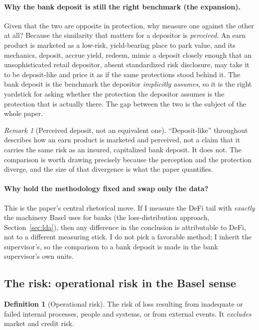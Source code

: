 \documentclass[11pt]{article}
\theoremstyle{definition}
\newtheorem{definition}[theorem]{Definition}
\theoremstyle{remark}
\newtheorem{remark}[theorem]{Remark}
\theoremstyle{definition}
\newcommand{\1}{\mathbf{1}}
\begin{document}
\paragraph{Why the bank deposit is still the right benchmark (the expansion).}
Given that the two are opposite in protection, why measure one against the other
at all? Because the similarity that matters for a depositor is \emph{perceived}.
An earn product is marketed as a low-risk, yield-bearing place to park value, and
its mechanics, deposit, accrue yield, redeem, mimic a deposit closely enough that
an unsophisticated retail depositor, absent standardized risk disclosure, may
take it to be deposit-like and price it as if the same protections stood behind
it. The bank deposit is the benchmark the depositor \emph{implicitly assumes}, so
it is the right yardstick for asking whether the protection the depositor assumes
is the protection that is actually there. The gap between the two is the subject
of the whole paper.

\begin{remark}[Perceived deposit, not an equivalent one]
``Deposit-like'' throughout describes how an earn product is marketed and
perceived, not a claim that it carries the same risk as an insured, capitalized
bank deposit. It does not. The comparison is worth drawing precisely because the
perception and the protection diverge, and the size of that divergence is what
the paper quantifies.
\end{remark}

\paragraph{Why hold the methodology fixed and swap only the data?}
This is the paper's central rhetorical move. If I measure the DeFi tail with
\emph{exactly} the machinery Basel uses for banks (the loss-distribution
approach, Section~\ref{sec:lda}), then any difference in the conclusion is
attributable to DeFi, not to a different measuring stick. I do not pick a
favorable method; I inherit the supervisor's, so the comparison to a bank
deposit is made in the bank supervisor's own units.

\subsection{The risk: operational risk in the Basel sense}\label{sec:oprisk}

\begin{definition}[Operational risk]
The risk of loss resulting from inadequate or failed internal processes,
people and systems, or from external events. It \emph{excludes} market and
credit risk.
\end{definition}
\end{document}
